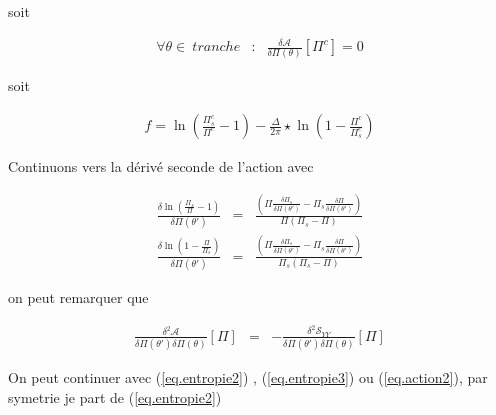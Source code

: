 soit 

\begin{eqnarray*}
	\forall \theta \in ~tranche & \colon &  \frac{\delta \mathcal{A}}{\delta \Pi(\theta) }[\Pi^c] = 0	
\end{eqnarray*}


 soit 
\begin{aff}
\begin{eqnarray*}
	f =  \ln \left ( \frac{ \Pi_s^c}{\Pi^c} -1 \right )  - \frac{\Delta}{2\pi} \star  \ln \left ( 1 - \frac{\Pi^c}{\Pi_s^c} \right )		
\end{eqnarray*}
\end{aff}

Continuons vers la dérivé seconde de l'action avec 

\begin{eqnarray*}
	\frac{\delta \ln \left ( \displaystyle \frac{ \Pi_s}{\Pi} -1 \right )}{\delta \Pi(\theta')} & = &  \frac{\displaystyle  \left ( \Pi \frac{\delta \Pi_s }{\delta \Pi (\theta') } - \Pi_s \frac{\delta \Pi }{\delta \Pi (\theta') } \right ) }{ \Pi ( \Pi_s - \Pi ) } \\
	\frac{\delta \ln \left ( \displaystyle  1- \frac{\Pi}{\Pi_s} \right )}{\delta \Pi(\theta')} & = &  \frac{\displaystyle  \left ( \Pi \frac{\delta \Pi_s }{\delta \Pi (\theta') } - \Pi_s \frac{\delta \Pi }{\delta \Pi (\theta') } \right ) }{ \Pi_s ( \Pi_s - \Pi ) } 			
\end{eqnarray*}

on peut remarquer que 

\begin{eqnarray*}
	\frac{\delta^2 \mathcal{A}}{\delta \Pi(\theta') \delta \Pi(\theta) }[\Pi] & = & - \frac{\delta^2 \mathcal{S}_{YY}}{\delta \Pi(\theta') \delta \Pi(\theta) }[\Pi]	
\end{eqnarray*}

On peut continuer avec (\ref{eq.entropie2}) , (\ref{eq.entropie3})  ou (\ref{eq.action2}), par symetrie je part de (\ref{eq.entropie2})

